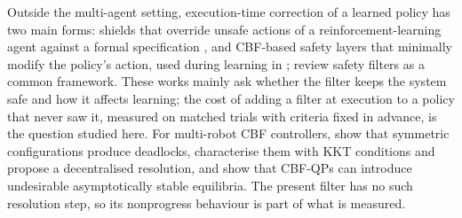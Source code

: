 \documentclass[11pt]{article}
\begin{document}
Outside the multi-agent setting, execution-time correction of a learned policy has two main forms:
shields that override unsafe actions of a reinforcement-learning agent against a formal specification
\cite{alshiekh2018}, and CBF-based safety layers that minimally modify the policy's action, used during
learning in \cite{cheng2019}; \cite{hsu2024} review safety filters as a common framework. These works
mainly ask whether the filter keeps the system safe and how it affects learning; the cost of adding a
filter at execution to a policy that never saw it, measured on matched trials with criteria fixed in
advance, is the question studied here. For multi-robot CBF controllers, \cite{grover2023} show that
symmetric configurations produce deadlocks, characterise them with KKT conditions and propose a
decentralised resolution, and \cite{reis2021} show that CBF-QPs can introduce undesirable asymptotically
stable equilibria. The present filter has no such resolution step, so its nonprogress behaviour is part
of what is measured.
\end{document}
